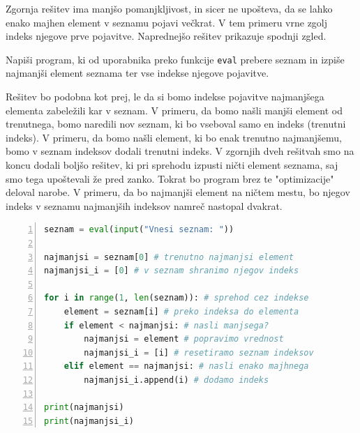 Zgornja rešitev ima manjšo pomanjkljivost, in sicer ne upošteva, da se lahko enako majhen element v seznamu pojavi večkrat. V tem primeru vrne zgolj indeks njegove prve pojavitve. Naprednejšo rešitev prikazuje spodnji zgled.

\begin{zgled}
Napiši program, ki od uporabnika preko funkcije \texttt{eval} prebere seznam in izpiše najmanjši element seznama ter vse indekse njegove pojavitve. 
\end{zgled}
\begin{resitev}
Rešitev bo podobna kot prej, le da si bomo indekse pojavitve najmanjšega elementa zabeležili kar v seznam. V primeru, da bomo našli manjši element od trenutnega, bomo naredili nov seznam, ki bo vseboval samo en indeks (trenutni indeks). V primeru, da bomo našli element, ki bo enak trenutno najmanjšemu, bomo v seznam indeksov dodali trenutni indeks. V zgornjih dveh rešitvah smo na koncu dodali boljšo rešitev, ki pri sprehodu izpusti ničti element seznama, saj smo tega upoštevali že pred zanko. Tokrat bo program brez te "optimizacije" deloval narobe. V primeru, da bo najmanjši element na ničtem mestu, bo njegov indeks v seznamu najmanjših indeksov namreč nastopal dvakrat.
\begin{lstlisting}[language=Python, showstringspaces=false,numbers=left]
seznam = eval(input("Vnesi seznam: "))

najmanjsi = seznam[0] # trenutno najmanjsi element
najmanjsi_i = [0] # v seznam shranimo njegov indeks

for i in range(1, len(seznam)): # sprehod cez indekse
    element = seznam[i] # preko indeksa do elementa
    if element < najmanjsi: # nasli manjsega?
        najmanjsi = element # popravimo vrednost
        najmanjsi_i = [i] # resetiramo seznam indeksov
    elif element == najmanjsi: # nasli enako majhnega
        najmanjsi_i.append(i) # dodamo indeks

print(najmanjsi)
print(najmanjsi_i)
\end{lstlisting}
\end{resitev}

